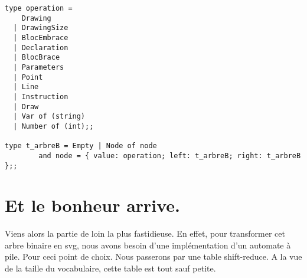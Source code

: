 \documentclass[11pt]{report} %
\begin{document}
\begin{lstlisting}[caption=Type arbre, language=caml]
type operation =
    Drawing
  | DrawingSize
  | BlocEmbrace
  | Declaration
  | BlocBrace
  | Parameters
  | Point
  | Line
  | Instruction
  | Draw
  | Var of (string)
  | Number of (int);;
  
type t_arbreB = Empty | Node of node
        and node = { value: operation; left: t_arbreB; right: t_arbreB };;
\end{lstlisting}

\section{Et le bonheur arrive.}
Viens alors la partie de loin la plus fastidieuse. En effet, pour transformer cet arbre binaire en svg, nous avons besoin d'une implémentation d'un automate à pile. Pour ceci point de choix. Nous passerons par une table shift-reduce. A la vue de la taille du vocabulaire, cette table est tout sauf petite.
\end{document}

